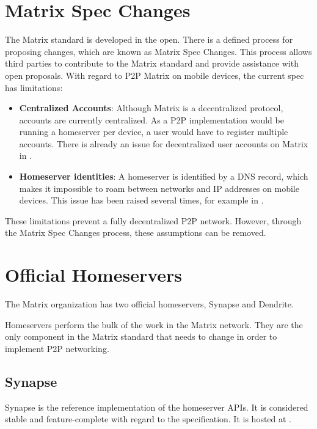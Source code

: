 \section{Matrix Spec Changes}
The Matrix standard is developed in the open.
There is a defined process for proposing changes, which are known as Matrix Spec Changes\cite{matrix_org_spec_changes}.
This process allows third parties to contribute to the Matrix standard and provide assistance with open proposals.
With regard to \ac{P2P} Matrix on mobile devices, the current spec has limitations:
\begin{itemize}
	\item{
	      \textbf{Centralized Accounts}:
	      Although Matrix is a decentralized protocol, accounts are currently centralized.
	      As a \ac{P2P} implementation would be running a homeserver per device, a user would have to register multiple accounts.
	      There is already an issue for decentralized user accounts on Matrix in .
	      }
	\item{
	      \textbf{Homeserver identities}:
	      A homeserver is identified by a DNS record, which makes it impossible to roam between networks and IP addresses on mobile devices.
	      This issue has been raised several times, for example in .
	      }
\end{itemize}

These limitations prevent a fully decentralized \ac{P2P} network.
However, through the Matrix Spec Changes process, these assumptions can be removed.

\section{Official Homeservers}\label{sec:official_homeservers}
The Matrix organization has two official homeservers, Synapse\cite{matrix_org_synapse} and Dendrite\cite{matrix_org_dendrite}.

Homeservers perform the bulk of the work in the Matrix network.
They are the only component in the Matrix standard that needs to change in order to implement \ac{P2P} networking\cite{fosdem_event_p2p_matrix}.

\subsection{Synapse}
Synapse is the reference implementation of the homeserver \ac{API}s.
It is considered stable and feature-complete with regard to the specification.
It is hosted at .


